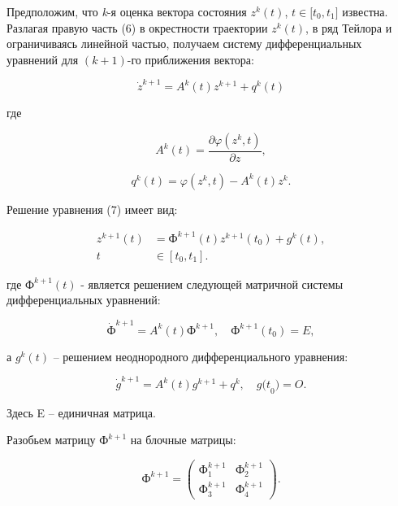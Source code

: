 \begin{multicols}{2}
Предположим, что \emph{k}-я оценка вектора состояния
\(z^{k}(t)\),
\(t \in \lbrack t_{0},t_{1}\rbrack\) известна. Разлагая правую часть (6)
в окрестности траектории \(z^{k}(t)\), в ряд
Тейлора и ограничиваясь линейной частью, получаем систему
дифференциальных уравнений для \((k + 1)\)-го приближения вектора:

\begin{equation}
{\dot{z}}^{k + 1} = A^{k}(t)z^{k + 1} + q^{k}(t)
\end{equation}

где

\begin{equation*}
A^{k}(t) = \frac{\partial\varphi(z^{k},t)}{\partial z},
\end{equation*}

\begin{equation*}
q^{k}(t) = \varphi\left( z^{k},t \right) - A^{k}(t)z^{k}.
\end{equation*}

Решение уравнения (7) имеет вид:

\begin{equation}
\begin{aligned}
z^{k + 1}(t) &= \text{Ф}^{k + 1}(t)z^{k + 1}\left( t_{0} \right) + g^{k}(t), \\
t &\in \left\lbrack t_{0}, t_{1} \right\rbrack.
\end{aligned}
\end{equation}

где \(Ф^{k + 1}(t)\) - является решением
следующей матричной системы дифференциальных уравнений:

\begin{equation}
{\dot{\text{Ф}}}^{k + 1} = A^{k}(t)\text{Ф}^{k + 1},\quad \text{Ф}^{k + 1}\left( t_{0} \right) = E,
\end{equation}

а \(g^{k}(t)\) -- решением неоднородного
дифференциального уравнения:

\begin{equation}
{\dot{g}}^{k + 1} = A^{k}(t)g^{k + 1} + q^{k},\quad {g(t}_{0}) = O.
\end{equation}

Здесь E -- единичная матрица.

Разобьем матрицу \(\text{Ф}^{k + 1}\) на блочные
матрицы:

\[\text{Ф}^{k + 1} = \begin{pmatrix}
\text{Ф}_{1}^{k + 1} & \text{Ф}_{2}^{k + 1} \\
\text{Ф}_{3}^{k + 1} & \text{Ф}_{4}^{k + 1}
\end{pmatrix}.\]


\end{multicols}

